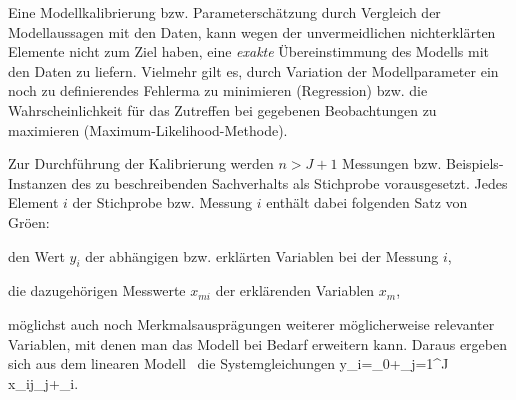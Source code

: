 Eine Modellkalibrierung bzw. Parametersch\"atzung durch
Vergleich der Modellaussagen mit den Daten,  kann wegen der
unvermeidlichen nichterkl\"arten Elemente nicht zum Ziel haben, 
eine \textit{exakte} \"Ubereinstimmung des  Modells mit
den Daten zu liefern. Vielmehr gilt es, durch Variation der 
Modellparameter ein
noch zu definierendes Fehlerma\3 zu minimieren (Regression) bzw. die
Wahrscheinlichkeit f\"ur das Zutreffen bei gegebenen Beobachtungen zu
maximieren (Maximum-Likelihood-Methode).

Zur Durchf\"uhrung der Kalibrierung werden $n>J+1$ Messungen bzw.
Beispiels-Instanzen des zu beschreibenden Sachverhalts
als Stichprobe vorausgesetzt. Jedes Element $i$ der Stichprobe
bzw. Messung $i$ enth\"alt
dabei folgenden Satz von Gr\"o\3en:
\bi
\item den Wert $y_i$
der abh\"angigen bzw. erkl\"arten Variablen bei der Messung 
$i$,
\item die dazugeh\"origen Messwerte
 $x_{mi}$ der erkl\"arenden Variablen $x_m$,
\item m\"oglichst auch noch Merkmalsauspr\"agungen weiterer
m\"oglicherweise relevanter  Variablen, mit denen man  das
Modell bei Bedarf erweitern kann.
\ei
Daraus ergeben sich aus dem linearen Modell~ die
Systemgleichungen
\be
\label{oekonLinSys}
y_i=\beta_0+\sum_{j=1}^J x_{ij}\beta_j+\epsilon_i.
\ee


